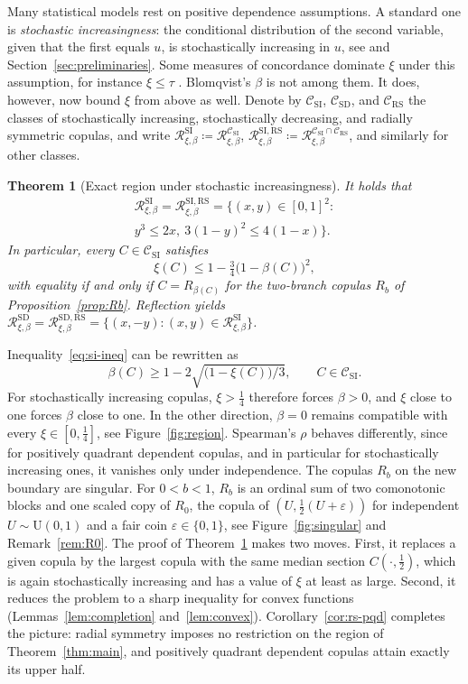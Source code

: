 \documentclass[twocolumn,a4paper]{article}
\numberwithin{equation}{section}
\newtheorem{theorem}{Theorem}[section]
\theoremstyle{remark}
\newcommand{\CC}{\mathcal{C}}
\newcommand{\RR}{\mathcal{R}}
\newcommand{\1}{\mathbf{1}}
\newcommand{\SI}{\mathrm{SI}}
\newcommand{\SD}{\mathrm{SD}}
\newcommand{\RS}{\mathrm{RS}}
\begin{document}
Many statistical models rest on positive dependence assumptions.
A standard one is \emph{stochastic increasingness}: the conditional distribution of the second variable, given that the first equals \(u\), is stochastically increasing in \(u\), see \cite{lehmann1966concepts} and Section~\ref{sec:preliminaries}.
Some measures of concordance dominate \(\xi\) under this assumption, for instance \(\xi\le\tau\) \cite[Thm.~1.1]{rockel2026kendall}.
Blomqvist's \(\beta\) is not among them.
It does, however, now bound \(\xi\) from above as well.
Denote by \(\CC_{\SI}\), \(\CC_{\SD}\), and \(\CC_{\RS}\) the classes of stochastically increasing, stochastically decreasing, and radially symmetric copulas, and write \(\RR^{\SI}_{\xi,\beta}\coloneqq\RR^{\CC_{\SI}}_{\xi,\beta}\), \(\RR^{\SI,\RS}_{\xi,\beta}\coloneqq\RR^{\CC_{\SI}\cap\CC_{\RS}}_{\xi,\beta}\), and similarly for other classes.

\begin{theorem}[Exact region under stochastic increasingness]\label{thm:si}
It holds that
\begin{multline*}
\RR^{\SI}_{\xi,\beta}=\RR^{\SI,\RS}_{\xi,\beta}=\bigl\{(x,y)\in[0,1]^2:\\
y^3\le2x,\ 3(1-y)^2\le4(1-x)\bigr\}.
\end{multline*}
In particular, every \(C\in\CC_{\SI}\) satisfies
\begin{equation}\label{eq:si-ineq}
\xi(C)\le1-\tfrac34\bigl(1-\beta(C)\bigr)^2,
\end{equation}
with equality if and only if \(C=R_{\beta(C)}\) for the two-branch copulas \(R_b\) of Proposition~\ref{prop:Rb}.
Reflection yields \(\RR^{\SD}_{\xi,\beta}=\RR^{\SD,\RS}_{\xi,\beta}=\{(x,-y):(x,y)\in\RR^{\SI}_{\xi,\beta}\}\).
\end{theorem}

Inequality~\eqref{eq:si-ineq} can be rewritten as
\[
\beta(C)\ge1-2\sqrt{\bigl(1-\xi(C)\bigr)/3},\qquad C\in\CC_{\SI}.
\]
For stochastically increasing copulas, \(\xi>\tfrac14\) therefore forces \(\beta>0\), and \(\xi\) close to one forces \(\beta\) close to one.
In the other direction, \(\beta=0\) remains compatible with every \(\xi\in[0,\tfrac14]\), see Figure~\ref{fig:region}.
Spearman's \(\rho\) behaves differently, since for positively quadrant dependent copulas, and in particular for stochastically increasing ones, it vanishes only under independence.
The copulas \(R_b\) on the new boundary are singular.
For \(0<b<1\), \(R_b\) is an ordinal sum of two comonotonic blocks and one scaled copy of \(R_0\), the copula of \((U,\tfrac12(U+\varepsilon))\) for independent \(U\sim\mathrm{U}(0,1)\) and a fair coin \(\varepsilon\in\{0,1\}\), see Figure~\ref{fig:singular} and Remark~\ref{rem:R0}.
The proof of Theorem~\ref{thm:si} makes two moves.
First, it replaces a given copula by the largest copula with the same median section \(C(\cdot,\tfrac12)\), which is again stochastically increasing and has a value of \(\xi\) at least as large.
Second, it reduces the problem to a sharp inequality for convex functions (Lemmas~\ref{lem:completion} and~\ref{lem:convex}).
Corollary~\ref{cor:rs-pqd} completes the picture: radial symmetry imposes no restriction on the region of Theorem~\ref{thm:main}, and positively quadrant dependent copulas attain exactly its upper half.
\end{document}
